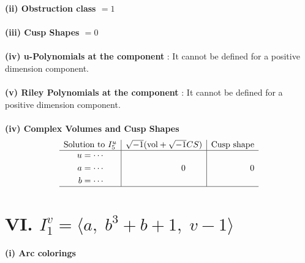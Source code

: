 \documentclass[1p]{elsarticle_modified}
\theoremstyle{definition}
\newcommand{\I}{\sqrt{-1}}
\begin{document}
\flushleft \textbf{(ii) Obstruction class $= 1$}\\~\\
\flushleft \textbf{(iii) Cusp Shapes $= 0$}\\~\\
\flushleft \textbf{(iv) u-Polynomials at the component} : It cannot be defined for a positive dimension component.\\~\\
\flushleft \textbf{(v) Riley Polynomials at the component} : It cannot be defined for a positive dimension component.\\~\\
\newpage\flushleft \textbf{(iv) Complex Volumes and Cusp Shapes}
$$\begin{array}{c|c|c} 
\text{Solution to }I^u_{5}& \I (\text{vol} + \sqrt{-1}CS) & \text{Cusp shape}\\
 \hline 
\begin{aligned}
u &= \cdots \\
a &= \cdots \\
b &= \cdots\end{aligned}
 & \phantom{-0.000000 } 0 & \phantom{-0.000000 } 0\\
 \hline 
 \end{array}
$$\newpage\renewcommand{\arraystretch}{1}
\centering \section*{VI. $I^v_{1}= \langle a,\;b^3+b+1,\;v-1 \rangle$}
\flushleft \textbf{(i) Arc colorings}\\
\end{document}
